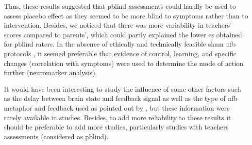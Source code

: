 Thus, these results suggested that \gls{pblind} assessments could hardly be used to assess placebo effect as they seemed to be more blind
to symptoms rather than to intervention. Besides, we noticed that there was more variability in teachers' scores compared to parents', which could partly
explained the lower \gls{es} obtained for \gls{pblind} raters. In the absence of ethically and technically feasible sham \gls{nfb} protocols 
\citep{World-Medical-Association2000}, it seemed preferable that evidence of control, learning, and specific changes (correlation with symptoms) were
used to determine the mode of action further (neuromarker analysis).      

It would have been interesting to study the influence of some other factors such as the delay between brain state and feedback 
signal as well as the type of \gls{nfb} metaphor and feedback used as pointed out by \citet{Alkoby2017}, but these information were rarely available in studies. Besides, 
to add more reliability to these results it should be preferable to add more studies, particularly studies with teachers assessments (considered as \gls{pblind}). 


